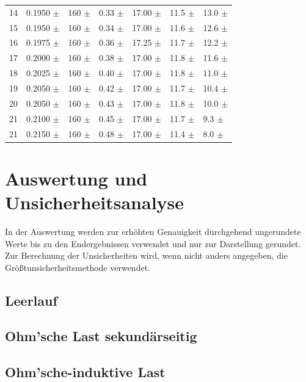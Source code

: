 \documentclass[12pt,a4paper,twoside]{article}
\begin{document}
\begin{table}[H]
\begin{tabular}{| l | l | l | l | l | l | l |}
        14 & 0.1950 $\pm$  & 160 $\pm$  & 0.33 $\pm$  & 17.00 $\pm$  & 11.5 $\pm$ & 13.0 $\pm$  \\
        15 & 0.1950 $\pm$  & 160 $\pm$  & 0.34 $\pm$  & 17.00 $\pm$  & 11.6 $\pm$ & 12.6 $\pm$  \\
        16 & 0.1975 $\pm$  & 160 $\pm$  & 0.36 $\pm$  & 17.25 $\pm$  & 11.7 $\pm$ & 12.2 $\pm$  \\
        17 & 0.2000 $\pm$  & 160 $\pm$  & 0.38 $\pm$  & 17.00 $\pm$  & 11.8 $\pm$ & 11.6 $\pm$  \\
        18 & 0.2025 $\pm$  & 160 $\pm$  & 0.40 $\pm$  & 17.00 $\pm$  & 11.8 $\pm$ & 11.0 $\pm$  \\
        19 & 0.2050 $\pm$  & 160 $\pm$  & 0.42 $\pm$  & 17.00 $\pm$  & 11.7 $\pm$ & 10.4 $\pm$  \\
        20 & 0.2050 $\pm$  & 160 $\pm$  & 0.43 $\pm$  & 17.00 $\pm$  & 11.8 $\pm$ & 10.0 $\pm$  \\
        21 & 0.2100 $\pm$  & 160 $\pm$  & 0.45 $\pm$  & 17.00 $\pm$  & 11.7 $\pm$ & 9.3 $\pm$  \\
        21 & 0.2150 $\pm$  & 160 $\pm$  & 0.48 $\pm$  & 17.00 $\pm$  & 11.4 $\pm$ & 8.0 $\pm$  \\
        \hline
    \end{tabular}
\end{table}



\section{Auswertung und Unsicherheitsanalyse} %

In der Auswertung werden zur erhöhten Genauigkeit durchgehend ungerundete Werte bis zu den Endergebnissen verwendet und nur zur Darstellung gerundet. \\
Zur Berechnung der Unsicherheiten wird, wenn nicht anders angegeben, die Größtunsicherheitsmethode verwendet.

\subsection{Leerlauf}
\subsection{Ohm'sche Last sekundärseitig}
\subsection{Ohm'sche-induktive Last}
\end{document}
